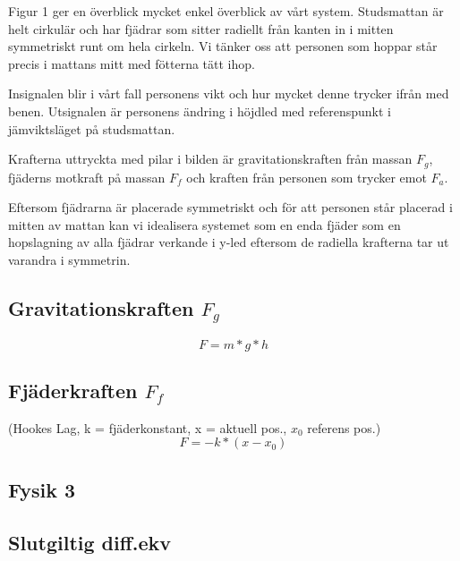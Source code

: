 \documentclass[10pt,a4paper]{article}
\begin{document}
Figur 1 ger en överblick mycket enkel överblick av vårt system. Studsmattan är helt cirkulär och har fjädrar som sitter radiellt från kanten in i mitten symmetriskt runt om hela cirkeln. Vi tänker oss att personen som hoppar står precis i mattans mitt med fötterna tätt ihop.

Insignalen blir i vårt fall personens vikt och hur mycket denne trycker ifrån med benen. Utsignalen är personens ändring i höjdled med referenspunkt i jämviktsläget på studsmattan.

Krafterna uttryckta med pilar i bilden är gravitationskraften från massan $F_g$, fjäderns motkraft på massan $F_f$ och kraften från personen som trycker emot $F_a$.

Eftersom fjädrarna är placerade symmetriskt och för att personen står placerad i mitten av mattan kan vi idealisera systemet som en enda fjäder som en hopslagning av alla fjädrar verkande i y-led eftersom de radiella krafterna tar ut varandra i symmetrin.

\subsection{Gravitationskraften $F_g$}

\begin{equation}
F = m * g * h
\end{equation}

\subsection{Fjäderkraften $F_f$}

(Hookes Lag, k = fjäderkonstant, x = aktuell pos., $x_0$ referens pos.)
\begin{equation}
F = - k * (x - x_0)
\end{equation}

\subsection{Fysik 3}

\subsection{Slutgiltig diff.ekv}
\end{document}
